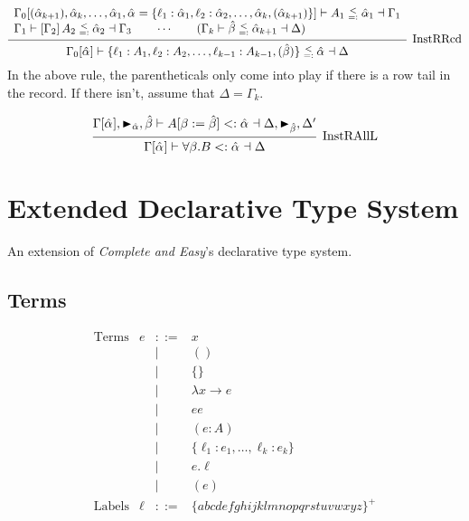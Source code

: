 \documentclass{article}
\newcommand{\rcd}[1]{\{#1\}}
\newcommand{\define}{::=}
\newcommand{\marker}[1]{\RHD_{#1}}
\newcommand{\subsume}{<:}
\newcommand{\prjSymbol}{.}
\newcommand{\instRSymbol}{\;\substack{<\\=:}\;}
\newcommand{\ev}{\hat}
\newcommand{\spc}{\qquad}
\newcommand{\apply}[1]{\left[#1\right]}
\newcommand{\eva}[1][]{\ev \alpha_{#1}}
\newcommand{\evb}{\ev \beta}
\newcommand{\subsumes}[4]{#1 \vdash #2 \subsume #3 \dashv #4}
\newcommand{\instR}[4]{#1 \vdash #2 \instRSymbol #3 \dashv #4}
\newcommand{\deduct}[3][]
{
  \begin{prooftree}
    \hypo{#2}
    \infer1[\text{#1}]{#3}
  \end{prooftree}
}
\begin{document}
\[
  \deduct[InstRRcd]
  {
    \begin{array}{l}
     \instR{\Gamma_0[(\eva[k+1]), \eva[k], \dots, \eva[1], \eva=\{\ell_1 : \eva[1],
      \ell_2 : \eva[2], \dots, \eva[k], (\eva[k+1])\}]}{A_1}{\eva[1]}{\Gamma_1} \\
    \instR{\Gamma_1}{\apply{\Gamma_2} A_2}{\eva[2]}{\Gamma_3} \spc \cdots \spc
     (\instR{\Gamma_k}{\evb}{\eva[k+1]}{\Delta})
  \end{array}
  }
  {\instR{\Gamma_0[\eva]}{\{\ell_1:A_1, \ell_2 : A_2, \dots, \ell_{k-1} : A_{k-1}, (\evb)\}}{\eva}{\Delta}}
\]
In the above rule, the parentheticals only come into play if there is a row tail
in the record. If there isn't, assume that \(\Delta = \Gamma_k\).

\[
  \deduct[InstRAllL]
  { \subsumes{\Gamma[\eva], \marker{\ev\alpha}, \evb}{A[\beta := \evb]}{\eva}{\Delta, \marker{\evb}, \Delta'} }
  { \subsumes{\Gamma[\eva]}{\forall \beta. B}{\eva}{\Delta} }
\]


\section{Extended Declarative Type System}
An extension of \emph{Complete and Easy}'s declarative type system.

\subsection{Terms}

\[
  \begin{array}{llcl}
    \text{Terms} & e & \define & x \\
                 & & | & () \\
                 & & | & \rcd{} \\
                 & & | & \lambda x \to e  \\
                 & & | & e e \\
                 & & | & (e : A) \\
                 & & | & \rcd{\ell_1 : e_1, \dots, \ell_k : e_k} \\
                 & & | & e \prjSymbol \ell \\
                 & & | & (e) \\
   \text{Labels} & \ell & \define & \{abcdefghijklmnopqrstuvwxyz\}^+
  \end{array}
\]
\end{document}
